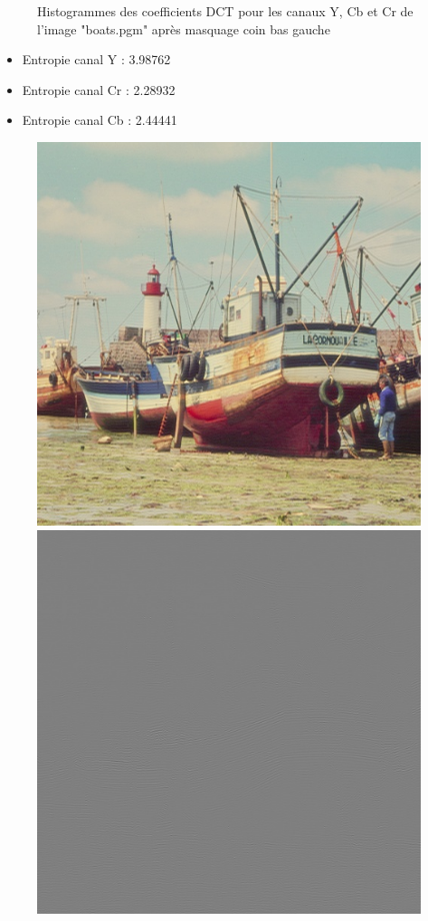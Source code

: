 \documentclass[12pt]{report}
\begin{document}
\begin{figure}[H]
\begin{center}
\caption{Histogrammes des coefficients DCT pour les canaux Y, Cb et Cr de l'image "boats.pgm" après masquage coin bas gauche}
\end{center}
\end{figure}

\begin{itemize}
\item Entropie canal Y : 3.98762
\item Entropie canal Cr : 2.28932
\item Entropie canal Cb : 2.44441
\end{itemize}

\begin{figure}[H]
\begin{center}
\includegraphics[scale=0.4]{../ImageRes/idct_masked2_result.jpg} 
\includegraphics[scale=0.4]{../ImageRes/idct_masked2_disto.jpg} 

\end{center}
\end{figure}
\end{document}
